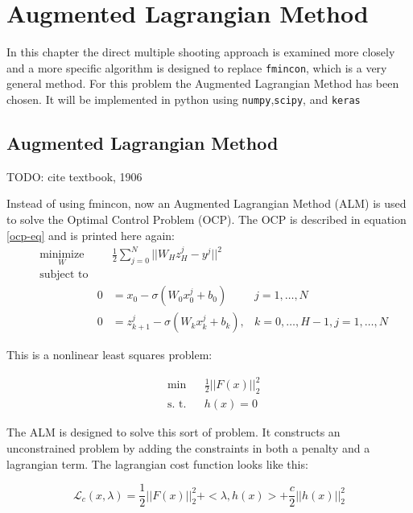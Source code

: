 \chapter{Augmented Lagrangian Method}
\label{cha:2}
In this chapter the direct multiple shooting approach is examined more closely and a more specific algorithm is designed to replace \texttt{fmincon}, which is a very general method. For this problem the Augmented Lagrangian Method has been chosen. It will be implemented in python using \texttt{numpy},\texttt{scipy}, and \texttt{keras}

\section{Augmented Lagrangian Method}
TODO: cite textbook, 1906


Instead of using fmincon, now an Augmented Lagrangian Method (ALM) is used to solve the Optimal Control Problem (OCP). The OCP is described in equation \ref{ocp-eq} and is printed here again:
\begin{equation*}
	\begin{aligned}
	& \underset{W}{\text{minimize}}
	& & \frac{1}{2}\sum\limits_{j=0}^{N}||W_Hz_H^j - y^j||^2 \\
	& \text{subject to} \\
	& & 0 &= x_0 - \sigma(W_0x_0^j + b_0) &j = 1,\ldots,N \\
	& & 0 &= z_{k+1}^j - \sigma(W_kx_k^j + b_k), &k = 0,\ldots,H-1,j = 1,\ldots,N
	\end{aligned}
\end{equation*}

This is a nonlinear least squares problem:

\begin{equation*}
	\begin{aligned}
	& \text{min}
	&  & \frac{1}{2} ||F(x)||^2_2 \\
	& \text{s. t.}
	& &  h(x) = 0
	\end{aligned}
\end{equation*}

The ALM is designed to solve this sort of problem. It constructs an unconstrained problem by adding the constraints in both a penalty and a lagrangian term. The lagrangian cost function looks like this:

\begin{equation}
\mathcal{L}_c(x,\lambda) = \frac{1}{2} ||F(x)||^2_2 + <\lambda,h(x)> + \frac{c}{2} || h(x) ||^2_2
\end{equation}

